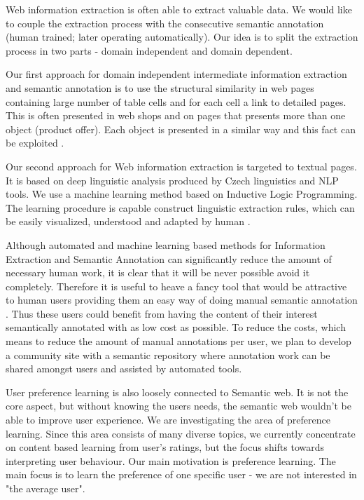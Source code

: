 \documentclass[runningheads,a4paper]{llncs}
\begin{document}
Web information extraction %
is often able to extract valuable data. We would like to couple the extraction process with the consecutive semantic annotation (human trained; later operating automatically). Our idea is to split the extraction process in two parts - domain independent and domain dependent. 


Our first approach for domain independent intermediate information extraction and semantic annotation is to use the structural similarity in web pages containing large number of table cells and for each cell a link to detailed pages. This is often presented in web shops and on pages that presents more than one object (product offer). Each object is presented in a similar way and this fact can be exploited \cite{biblio:EcHoUncertaintyIssues2008}.


Our second approach for Web information extraction is targeted to textual pages. It is based on deep linguistic analysis produced by Czech linguistics and NLP tools. We use a machine learning method based on Inductive Logic Programming. The learning procedure is capable construct linguistic extraction rules, which can be easily visualized, understood and adapted by human \cite{biblio:DedekISWC2010}. 

Although automated and machine learning based methods for Information Extraction and Semantic Annotation can significantly reduce the amount of necessary human work, it is clear that it will be never possible avoid it completely. Therefore it is useful to heave a fancy tool that would be attractive to human users providing them an easy way of doing manual semantic annotation \cite{biblio:FiserMaster}. Thus these users could benefit from having the content of their interest semantically annotated with as low cost as possible. To reduce the costs, which means to reduce the amount of manual annotations per user, we plan to develop a community site with a semantic repository \cite{biblio:LasekWWW} where annotation work can be shared amongst users and assisted by automated tools.

User preference learning is also loosely connected to Semantic web. It is not the core aspect, but without knowing the users needs, the semantic web wouldn't be able to improve user experience. We are investigating the area of preference learning. Since this area consists of many diverse topics, we currently concentrate on content based learning from user's ratings, but the focus shifts towards interpreting user behaviour. Our main motivation is preference learning. The main focus is to learn the preference of one specific user - we are not interested in "the average user".
\end{document}

